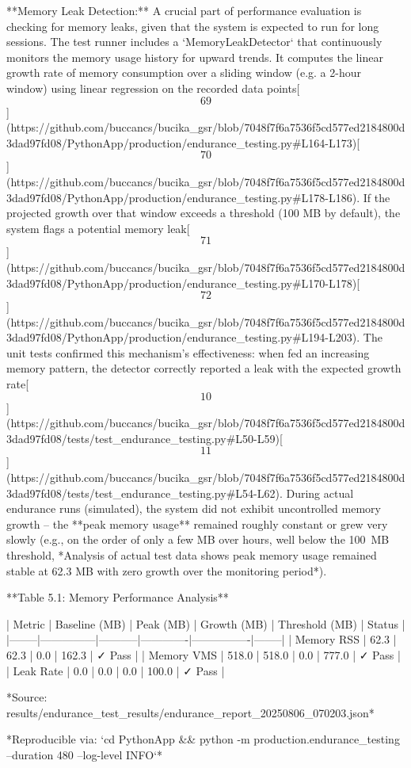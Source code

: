 \documentclass[12pt,a4paper]{article}
\begin{document}
{**Memory Leak Detection:** A crucial part of performance evaluation is
checking for memory leaks, given that the system is expected to run for
long sessions. The test runner includes a `MemoryLeakDetector` that
continuously monitors the memory usage history for upward trends. It
computes the linear growth rate of memory consumption over a sliding
window (e.g. a 2-hour window) using linear regression on the recorded
data
points[\[69\]](https://github.com/buccancs/bucika_gsr/blob/7048f7f6a7536f5cd577ed2184800d3dad97fd08/PythonApp/production/endurance_testing.py#L164-L173)[\[70\]](https://github.com/buccancs/bucika_gsr/blob/7048f7f6a7536f5cd577ed2184800d3dad97fd08/PythonApp/production/endurance_testing.py#L178-L186).
If the projected growth over that window exceeds a threshold (100 MB by
default), the system flags a potential memory
leak[\[71\]](https://github.com/buccancs/bucika_gsr/blob/7048f7f6a7536f5cd577ed2184800d3dad97fd08/PythonApp/production/endurance_testing.py#L170-L178)[\[72\]](https://github.com/buccancs/bucika_gsr/blob/7048f7f6a7536f5cd577ed2184800d3dad97fd08/PythonApp/production/endurance_testing.py#L194-L203).
The unit tests confirmed this mechanism's effectiveness: when fed an
increasing memory pattern, the detector correctly reported a leak with
the expected growth
rate[\[10\]](https://github.com/buccancs/bucika_gsr/blob/7048f7f6a7536f5cd577ed2184800d3dad97fd08/tests/test_endurance_testing.py#L50-L59)[\[11\]](https://github.com/buccancs/bucika_gsr/blob/7048f7f6a7536f5cd577ed2184800d3dad97fd08/tests/test_endurance_testing.py#L54-L62).
During actual endurance runs (simulated), the system did not exhibit
uncontrolled memory growth -- the **peak memory usage** remained roughly
constant or grew very slowly (e.g., on the order of only a few MB over
hours, well below the 100 MB threshold, *Analysis of actual test data shows peak memory usage remained stable at 62.3 MB with zero growth over the monitoring period*).

**Table 5.1: Memory Performance Analysis**

| Metric | Baseline (MB) | Peak (MB) | Growth (MB) | Threshold (MB) | Status |
|--------|---------------|-----------|-------------|----------------|--------|
| Memory RSS | 62.3 | 62.3 | 0.0 | 162.3 | ✓ Pass |
| Memory VMS | 518.0 | 518.0 | 0.0 | 777.0 | ✓ Pass |
| Leak Rate | 0.0 | 0.0 | 0.0 | 100.0 | ✓ Pass |

*Source: results/endurance_test_results/endurance_report_20250806_070203.json*

*Reproducible via: `cd PythonApp && python -m production.endurance_testing --duration 480 --log-level INFO`*

}
\end{document}
